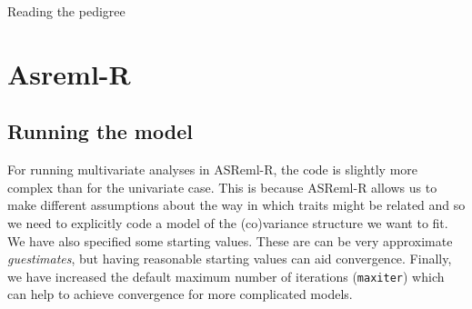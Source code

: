 \documentclass[
  12pt,
]{book}
\newenvironment{Shaded}{\begin{snugshade}}{\end{snugshade}}
\newcommand{\FunctionTok}[1]{\textcolor[rgb]{0.00,0.00,0.00}{#1}}
\newcommand{\NormalTok}[1]{#1}
\newcommand{\OtherTok}[1]{\textcolor[rgb]{0.56,0.35,0.01}{#1}}
\newcommand{\SpecialCharTok}[1]{\textcolor[rgb]{0.00,0.00,0.00}{#1}}
\newcommand{\StringTok}[1]{\textcolor[rgb]{0.31,0.60,0.02}{#1}}
\begin{document}
Reading the pedigree

\begin{Shaded}
\end{Shaded}

\hypertarget{asreml-biv}{%
\section{Asreml-R}\label{asreml-biv}}

\hypertarget{running-the-model-2}{%
\subsection{Running the model}\label{running-the-model-2}}

For running multivariate analyses in ASReml-R, the code is slightly more complex than for the univariate case. This is because ASReml-R allows us to make different assumptions about the way in which traits might be related and so we need to explicitly code a model of the (co)variance structure we want to fit. We have also specified some starting values. These are can be very approximate \emph{guestimates}, but having reasonable starting values can aid convergence. Finally, we have increased the default maximum number of iterations (\texttt{maxiter}) which can help to achieve convergence for more complicated models.
\end{document}
